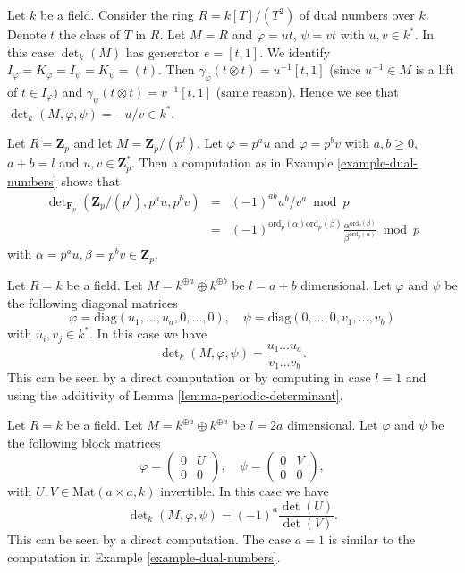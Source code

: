 \begin{example}
\label{example-dual-numbers}
Let $k$ be a field.
Consider the ring $R = k[T]/(T^2)$ of dual numbers over $k$.
Denote $t$ the class of $T$ in $R$.
Let $M = R$ and $\varphi = ut$, $\psi = vt$ with $u, v \in k^*$.
In this case $\det_k(M)$ has generator $e = [t, 1]$.
We identify $I_\varphi = K_\varphi = I_\psi = K_\psi = (t)$.
Then $\gamma_\varphi(t \otimes t) = u^{-1}[t, 1]$
(since $u^{-1} \in M$ is a lift of $t \in I_\varphi$)
and $\gamma_\psi(t \otimes t) = v^{-1}[t, 1]$ (same reason).
Hence we see that $\det_k(M, \varphi, \psi) = -u/v \in k^*$.
\end{example}

\begin{example}
\label{example-Zp}
Let $R = \mathbf{Z}_p$ and let $M = \mathbf{Z}_p/(p^l)$.
Let $\varphi = p^a u$ and $\varphi = p^b v$ with $a, b \geq 0$,
$a + b = l$ and $u, v \in \mathbf{Z}_p^*$.
Then a computation as in Example \ref{example-dual-numbers}
shows that
\begin{eqnarray*}
\det\nolimits_{\mathbf{F}_p}(\mathbf{Z}_p/(p^l), p^au, p^bv) & = &
(-1)^{ab}u^b/v^a \bmod p \\
& = &
(-1)^{\text{ord}_p(\alpha)\text{ord}_p(\beta)}
\frac{\alpha^{\text{ord}_p(\beta)}}{\beta^{\text{ord}_p(\alpha)}} \bmod p
\end{eqnarray*}
with $\alpha = p^au, \beta = p^bv \in \mathbf{Z}_p$.
\end{example}

\begin{example}
\label{example-generic-vector-space}
Let $R = k$ be a field.
Let $M = k^{\oplus a} \oplus k^{\oplus b}$ be $l = a + b$ dimensional.
Let $\varphi$ and $\psi$ be the following diagonal matrices
$$
\varphi = \text{diag}(u_1, \ldots, u_a, 0, \ldots, 0),
\quad
\psi = \text{diag}(0, \ldots, 0, v_1, \ldots, v_b)
$$
with $u_i, v_j \in k^*$. In this case we have
$$
\det\nolimits_k(M, \varphi, \psi)
=
\frac{u_1 \ldots u_a}{v_1 \ldots v_b}.
$$
This can be seen by a direct computation or by computing in case $l = 1$
and using the additivity of Lemma \ref{lemma-periodic-determinant}.
\end{example}

\begin{example}
\label{example-special-vector-space}
Let $R = k$ be a field.
Let $M = k^{\oplus a} \oplus k^{\oplus a}$ be $l = 2a$ dimensional.
Let $\varphi$ and $\psi$ be the following block matrices
$$
\varphi =
\left(
\begin{matrix}
0 & U \\
0 & 0
\end{matrix}
\right),
\quad
\psi =
\left(
\begin{matrix}
0 & V \\
0 & 0
\end{matrix}
\right),
$$
with $U, V \in \text{Mat}(a \times a, k)$ invertible.
In this case we have
$$
\det\nolimits_k(M, \varphi, \psi)
=
(-1)^a\frac{\det(U)}{\det(V)}.
$$
This can be seen by a direct computation.
The case $a = 1$ is similar to the computation in
Example \ref{example-dual-numbers}.
\end{example}

